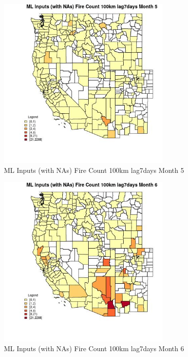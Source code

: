 \begin{figure} 
\centering  
\includegraphics[width=0.77\textwidth]{Code_Outputs/Report_ML_input_PM25_Step4_part_e_de_duplicated_aves_compiled_2019-05-21wNAs_CountyFire_Count_100km_lag7daysmedianMonth5.jpg} 
\caption{\label{fig:Report_ML_input_PM25_Step4_part_e_de_duplicated_aves_compiled_2019-05-21wNAsCountyFire_Count_100km_lag7daysmedianMonth5}ML Inputs (with NAs) Fire Count 100km lag7days Month 5} 
\end{figure} 
 

\begin{figure} 
\centering  
\includegraphics[width=0.77\textwidth]{Code_Outputs/Report_ML_input_PM25_Step4_part_e_de_duplicated_aves_compiled_2019-05-21wNAs_CountyFire_Count_100km_lag7daysmedianMonth6.jpg} 
\caption{\label{fig:Report_ML_input_PM25_Step4_part_e_de_duplicated_aves_compiled_2019-05-21wNAsCountyFire_Count_100km_lag7daysmedianMonth6}ML Inputs (with NAs) Fire Count 100km lag7days Month 6} 
\end{figure} 
 

